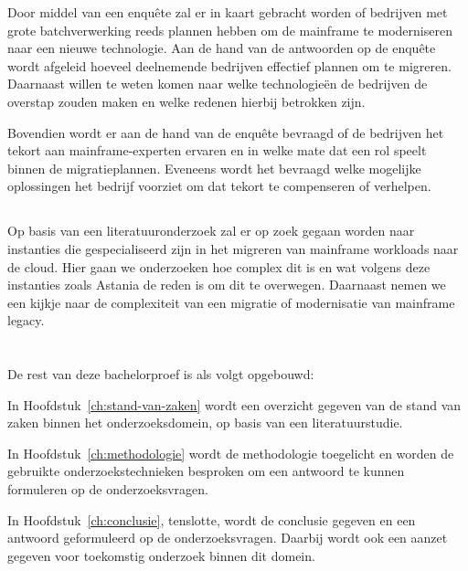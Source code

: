 Door middel van een enquête zal er in kaart gebracht worden of bedrijven met grote batchverwerking reeds plannen hebben om de mainframe te moderniseren naar een nieuwe technologie. Aan de hand van de antwoorden op de enquête wordt afgeleid hoeveel deelnemende bedrijven effectief plannen om te migreren. Daarnaast willen te weten komen naar welke technologieën de bedrijven de overstap zouden maken en welke redenen hierbij betrokken zijn. 

Bovendien wordt er aan de hand van de enquête bevraagd of de bedrijven het tekort aan mainframe-experten ervaren en in welke mate dat een rol speelt binnen de migratieplannen. Eveneens wordt het bevraagd welke mogelijke oplossingen het bedrijf voorziet om dat tekort te compenseren of verhelpen. 

\subsection{}

Op basis van een literatuuronderzoek zal er op zoek gegaan worden naar instanties die gespecialiseerd zijn in het migreren van mainframe workloads naar de cloud. Hier gaan we onderzoeken hoe complex dit is en wat volgens deze instanties zoals Astania de reden is om dit te overwegen. Daarnaast nemen we een kijkje naar de complexiteit van een migratie of modernisatie van mainframe legacy.

\section{}
\label{sec:opzet-bachelorproef}


De rest van deze bachelorproef is als volgt opgebouwd:

In Hoofdstuk~\ref{ch:stand-van-zaken} wordt een overzicht gegeven van de stand van zaken binnen het onderzoeksdomein, op basis van een literatuurstudie.

In Hoofdstuk~\ref{ch:methodologie} wordt de methodologie toegelicht en worden de gebruikte onderzoekstechnieken besproken om een antwoord te kunnen formuleren op de onderzoeksvragen.


In Hoofdstuk~\ref{ch:conclusie}, tenslotte, wordt de conclusie gegeven en een antwoord geformuleerd op de onderzoeksvragen. Daarbij wordt ook een aanzet gegeven voor toekomstig onderzoek binnen dit domein.